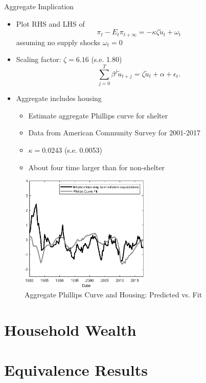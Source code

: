 \documentclass[english,xcolor=svgnames]{beamer}
\begin{document}
\begin{frame}{Aggregate Implication}\label{agg_impl}
	\begin{itemize}
		\itemsep1em 
		\item Plot RHS and LHS of
		\[ \pi_{t} - E_{t}\pi_{t+\infty} =-\kappa \zeta \tilde{u}_{t} + \omega_t\]
		assuming no supply shocks $\omega_t = 0$
		\item Scaling factor: $\zeta = 6.16$ (s.e. 1.80)
		\[\sum_{j=0}^{T} \beta^j \tilde{u}_{t+j} = \zeta \tilde{u}_{t} + \alpha + \epsilon_{t}. \]
		\item Aggregate includes housing 
		\begin{itemize}
			\item Estimate aggregate Phillips curve for shelter
			\item Data from American Community Survey for 2001-2017
			\item $\kappa = 0.0243$ (s.e. 0.0053) \hyperlink{shelter}{}
			\item About four time larger than for non-shelter
		\end{itemize}
	\end{itemize}
\end{frame}



\begin{frame}[label=flatflatter]
	\vspace{30pt}
	\begin{figure}[t]
		\centering
		\includegraphics[width = 0.55\textwidth]{figures/fit_pc_ppt_housing.eps}
		\caption{Aggregate Phillips Curve and Housing: Predicted vs. Fit}
	\end{figure}
\end{frame}

\section{Household Wealth}

\section{Equivalence Results}
\end{document}
